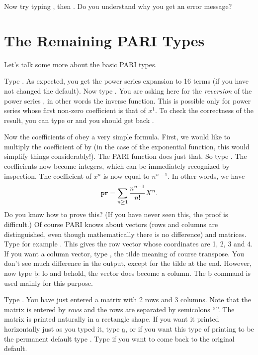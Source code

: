 Now try typing , then
. Do you understand why you get an error message?

\section{The Remaining PARI Types}
Let's talk some more about the basic PARI types.

Type . As expected, you get the power series expansion
to 16 terms (if you have not changed the default). Now type
. You are asking here for the {\it reversion\/} of the
power series , in other words the inverse function. This is possible
only for power series whose first non-zero coefficient is that of $x^1$.  To
check the correctness of the result, you can type  or
 and you should get back .

Now the coefficients of  obey a very simple formula. First, we would
like to multiply the coefficient of  by  (in the case of
the exponential function, this would simplify things considerably!). The PARI
function  does just that. So type .
The coefficients now become integers, which can be immediately recognized by
inspection. The coefficient of $x^n$ is now equal to
$n^{n-1}$. In other words, we have
%
$${\tt pr} = \sum_{n\ge1}{{n^{n-1}}\over{n!}} X^{n}.$$
%
Do you know how to prove this? (If you have never seen this, the proof is
difficult.)
\smallskip
%
Of course PARI knows about vectors (rows and columns are distinguished, even
though mathematically there is no difference) and matrices. Type for example
\kbd{[1,2,3,4]}. This gives the row vector whose coordinates are 1, 2, 3 and
4.  If you want a column vector, type \kbd{[1,2,3,4]\~{}}, the tilde meaning
of course transpose. You don't see much difference in the output, except for
the tilde at the end. However, now type \b{b}: lo and behold, the vector does
become a column. The \b{b} command is used mainly for this purpose.

Type . You have just entered a matrix with 2 rows and
3 columns. Note that the matrix is entered by {\it rows\/} and the rows are
separated by semicolons ``\kbd{;}''. The matrix is printed naturally in a
rectangle shape. If you want it printed horizontally just as you typed it,
type \b{a}, or if you want this type of printing to be the permanent default
type . Type  if you want to
come back to the original default.

